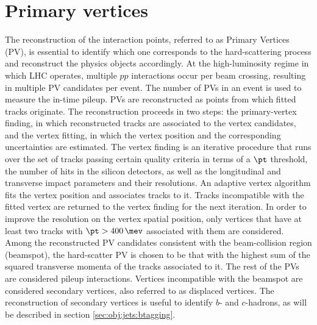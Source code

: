 \section{Primary vertices}
\label{chp:obj:PVs}

The reconstruction of the interaction points, referred to as Primary Vertices (PV), is essential to identify which one corresponds to the hard-scattering process and reconstruct the physics objects accordingly.
At the high-luminosity regime in which LHC operates, multiple $pp$ interactions occur per beam crossing, resulting in multiple PV candidates per event. The number of PVs in an event is used to measure the in-time pileup.
PVs are reconstructed as points from which fitted tracks originate. The reconstruction proceeds in two steps: the primary-vertex finding, in which reconstructed tracks are associated to the vertex candidates, and the vertex fitting, in which the vertex position and the corresponding uncertainties are estimated.
The vertex finding is an iterative procedure that runs over the set of tracks passing certain quality criteria in terms of a $\pt$ threshold, the number of hits in the silicon detectors, as well as the longitudinal and transverse impact parameters and their resolutions.
An adaptive vertex algorithm \cite{ATLAS-CONF-2010-069} fits the vertex position and associates tracks to it. Tracks incompatible with the fitted vertex are returned to the vertex finding for the next iteration. 
In order to improve the resolution on the vertex spatial position, only vertices that have at least two tracks with $\pt > 400\,\mev$ associated with them are considered.
Among the reconstructed PV candidates consistent with the beam-collision region (beamspot), the hard-scatter PV is chosen to be that with the highest sum of the squared transverse momenta of the tracks associated to it. The rest of the PVs are considered pileup interactions. Vertices incompatible with the beamspot are considered secondary vertices, also referred to as displaced vertices. The reconstruction of secondary vertices is useful to identify $b$- and $c$-hadrons, as will be described in section \ref{sec:obj:jets:btagging}.


